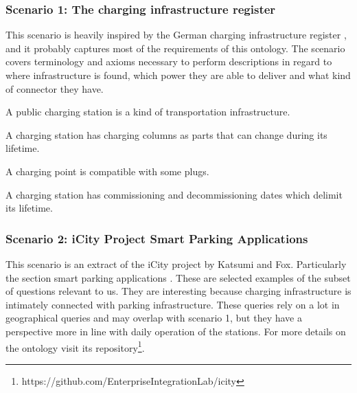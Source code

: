 \subsubsection*{Scenario 1: The charging infrastructure register}

This scenario is heavily inspired by the German charging infrastructure
register \cite{Bundesnetzagentur.27Oct2023}, and it probably captures most of
the requirements of this ontology. The scenario covers terminology and axioms
necessary to perform descriptions in regard to where infrastructure is found,
which power they are able to deliver and what kind of connector they have.

\begin{namedbreak}
    A public charging station is a kind of transportation infrastructure.
\end{namedbreak}

\label{CQ1.1}\begin{namedbreak}
    A charging station has charging columns as parts that can change during its lifetime.
\end{namedbreak}
\begin{namedbreak}
    A charging point is compatible with some plugs.
\end{namedbreak}

\begin{namedbreak}
    A charging station has commissioning and decommissioning dates which delimit its lifetime.
\end{namedbreak}

\subsubsection*{Scenario 2: iCity Project Smart Parking Applications}

This scenario is an extract of the iCity project by Katsumi and Fox.
Particularly the section smart parking applications \cite{Katsumi.2020}. These
are selected examples of the subset of questions relevant to us. They are
interesting because charging infrastructure is intimately connected with
parking infrastructure. These queries rely on a lot in geographical queries and
may overlap with scenario 1, but they have a perspective more in line with
daily operation of the stations. For more details on the ontology visit its
repository\footnote{https://github.com/EnterpriseIntegrationLab/icity}.


